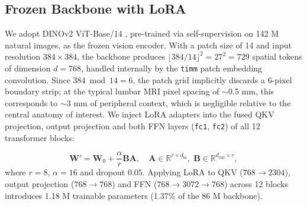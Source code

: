 \documentclass[journal]{IEEEtran}
\begin{document}
% 


\subsection{Frozen Backbone with LoRA}
We adopt DINOv2 ViT-Base/14 \cite{oquab2024dinov2}, pre-trained via self-supervision on 142 M natural images, as the frozen vision encoder. With a patch size of 14 and input resolution $384 \times 384$, the backbone produces $\lfloor 384/14 \rfloor^2 = 27^2 = 729$ spatial tokens of dimension $d=768$, handled internally by the \texttt{timm} patch embedding convolution. Since $384 \bmod 14 = 6$, the patch grid implicitly discards a 6-pixel boundary strip; at the typical lumbar MRI pixel spacing of $\sim$0.5 mm, this corresponds to $\sim$3 mm of peripheral context, which is negligible relative to the central anatomy of interest. We inject LoRA \cite{mao2024lora_survey} adapters into the fused QKV projection, output projection and both FFN layers (\texttt{fc1}, \texttt{fc2}) of all 12 transformer blocks:

\begin{equation}
    \mathbf{W}' = \mathbf{W}_0 + \frac{\alpha}{r} \mathbf{B}\mathbf{A},
    \quad \mathbf{A} \in \mathbb{R}^{r \times d_{\text{in}}}, \; \mathbf{B} \in \mathbb{R}^{d_{\text{out}} \times r},
    \label{eq:lora}
\end{equation}
where $r=8$, $\alpha=16$ and dropout $0.05$.
Applying LoRA to QKV ($768 \to 2304$), output projection ($768 \to 768$) and FFN ($768 \to 3072 \to 768$) across 12 blocks introduces 1.18 M trainable parameters (1.37\% of the 86 M backbone).
\end{document}
